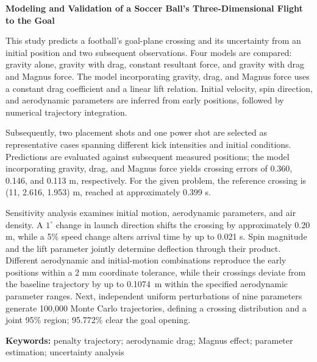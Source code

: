 \documentclass[12pt,letterpaper]{article}
\newcommand{\SensitivityConditionalShift}{0.1074}
\begin{document}
\begin{center}
{\Large\bfseries Modeling and Validation of a Soccer Ball's Three-Dimensional Flight to the Goal\par}
\vspace{2mm}{\bfseries Problem B\par}
\vspace{3mm}{\bfseries Abstract\par}
\end{center}
\noindent\hspace*{\parindent}This study predicts a football's goal-plane crossing and its uncertainty from an initial position and two subsequent observations. Four models are compared: gravity alone, gravity with drag, constant resultant force, and gravity with drag and Magnus force. The model incorporating gravity, drag, and Magnus force uses a constant drag coefficient and a linear lift relation. Initial velocity, spin direction, and aerodynamic parameters are inferred from early positions, followed by numerical trajectory integration.

Subsequently, two placement shots and one power shot are selected as representative cases spanning different kick intensities and initial conditions. Predictions are evaluated against subsequent measured positions; the model incorporating gravity, drag, and Magnus force yields crossing errors of 0.360, 0.146, and 0.113 m, respectively. For the given problem, the reference crossing is (11, 2.616, 1.953) m, reached at approximately 0.399 s.

Sensitivity analysis examines initial motion, aerodynamic parameters, and air density. A $1^\circ$ change in launch direction shifts the crossing by approximately 0.20 m, while a 5\% speed change alters arrival time by up to 0.021 s. Spin magnitude and the lift parameter jointly determine deflection through their product. Different aerodynamic and initial-motion combinations reproduce the early positions within a 2 mm coordinate tolerance, while their crossings deviate from the baseline trajectory by up to \SensitivityConditionalShift\ m within the specified aerodynamic parameter ranges. Next, independent uniform perturbations of nine parameters generate 100,000 Monte Carlo trajectories, defining a crossing distribution and a joint 95\% region; 95.772\% clear the goal opening.

\noindent\textbf{Keywords:} penalty trajectory; aerodynamic drag; Magnus effect; parameter estimation; uncertainty analysis
\newpage\begingroup\normalfont\normalsize\setlength{\baselineskip}{13.2pt}\tableofcontents\endgroup\newpage
\end{document}
